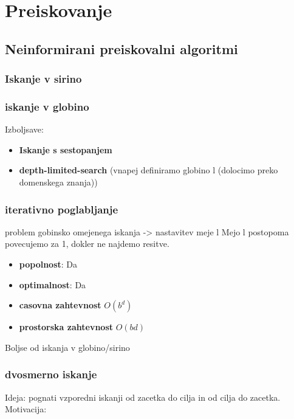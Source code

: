 \section{Preiskovanje}

\subsection{Neinformirani preiskovalni algoritmi}

\subsubsection{Iskanje v sirino}

\subsubsection{iskanje v globino}

Izboljsave:
\begin{itemize}
    \item \textbf{Iskanje s sestopanjem}
    \item \textbf{depth-limited-search} (vnapej definiramo globino l (dolocimo preko domenskega znanja))
\end{itemize}

\subsubsection{iterativno poglabljanje}
problem gobinsko omejenega iskanja -> nastavitev meje l
Mejo l postopoma povecujemo za 1, dokler ne najdemo resitve.
\begin{itemize}[noitemsep,topsep=0pt]
    \item \textbf{popolnost}: Da
    \item \textbf{optimalnost}: Da
    \item \textbf{casovna zahtevnost} $O(b^d)$
    \item \textbf{prostorska zahtevnost} $O(bd)$
\end{itemize}
Boljse od iskanja v globino/sirino

\subsubsection{dvosmerno iskanje}
Ideja: pognati vzporedni iskanji od zacetka do cilja in od cilja do zacetka.\\
Motivacija: \\ 

